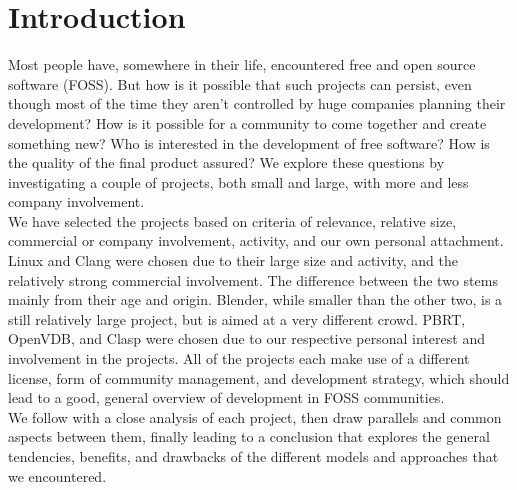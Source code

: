 \section{Introduction}
Most people have, somewhere in their life, encountered free and open source software (FOSS). But how is it possible that such projects can persist, even though most of the time they aren't controlled by huge companies planning their development? How is it possible for a community to come together and create something new? Who is interested in the development of free software? How is the quality of the final product assured? We explore these questions by investigating a couple of projects, both small and large, with more and less company involvement. \\

We have selected the projects based on criteria of relevance, relative size, commercial or company involvement, activity, and our own personal attachment. Linux and Clang were chosen due to their large size and activity, and the relatively strong commercial involvement. The difference between the two stems mainly from their age and origin. Blender, while smaller than the other two, is a still relatively large project, but is aimed at a very different crowd. PBRT, OpenVDB, and Clasp were chosen due to our respective personal interest and involvement in the projects. All of the projects each make use of a different license, form of community management, and development strategy, which should lead to a good, general overview of development in FOSS communities. \\

We follow with a close analysis of each project, then draw parallels and common aspects between them, finally leading to a conclusion that explores the general tendencies, benefits, and drawbacks of the different models and approaches that we encountered.

